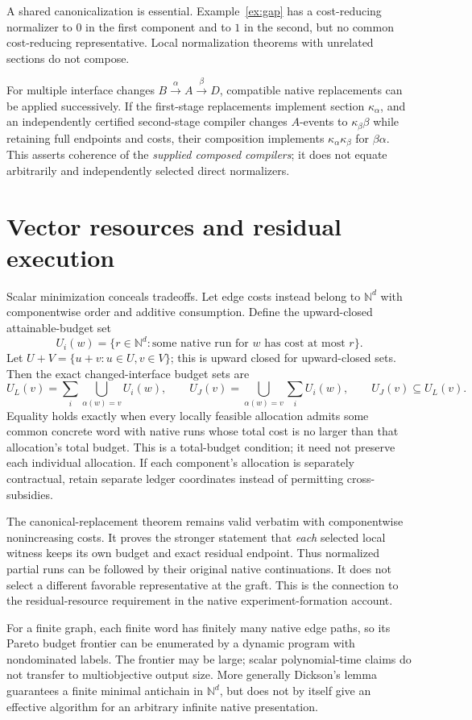 \documentclass[11pt]{article}
\newcommand{\NN}{\mathbb N}
\begin{document}
A shared canonicalization is essential. Example~\ref{ex:gap} has a cost-reducing normalizer to $0$ in the first component and to $1$ in the second, but no common cost-reducing representative. Local normalization theorems with unrelated sections do not compose.

For multiple interface changes $B\xrightarrow{\alpha}A\xrightarrow{\beta}D$, compatible native replacements can be applied successively. If the first-stage replacements implement section $\kappa_\alpha$, and an independently certified second-stage compiler changes $A$-events to $\kappa_\beta\beta$ while retaining full endpoints and costs, their composition implements $\kappa_\alpha\kappa_\beta$ for $\beta\alpha$. This asserts coherence of the \emph{supplied composed compilers}; it does not equate arbitrarily and independently selected direct normalizers.

\section{Vector resources and residual execution}
Scalar minimization conceals tradeoffs. Let edge costs instead belong to $\NN^d$ with componentwise order and additive consumption. Define the upward-closed attainable-budget set
\[
 U_i(w)=\{r\in\NN^d:\text{some native run for }w\text{ has cost at most }r\}.
\]
Let $U+V=\{u+v:u\in U,v\in V\}$; this is upward closed for upward-closed sets. Then the exact changed-interface budget sets are
\[
 U_L(v)=\sum_i\bigcup_{\alpha(w)=v}U_i(w),\qquad
 U_J(v)=\bigcup_{\alpha(w)=v}\sum_i U_i(w),
 \qquad U_J(v)\subseteq U_L(v).
\]
Equality holds exactly when every locally feasible allocation admits some common concrete word with native runs whose total cost is no larger than that allocation's total budget. This is a total-budget condition; it need not preserve each individual allocation. If each component's allocation is separately contractual, retain separate ledger coordinates instead of permitting cross-subsidies.

The canonical-replacement theorem remains valid verbatim with componentwise nonincreasing costs. It proves the stronger statement that \emph{each} selected local witness keeps its own budget and exact residual endpoint. Thus normalized partial runs can be followed by their original native continuations. It does not select a different favorable representative at the graft. This is the connection to the residual-resource requirement in the native experiment-formation account.

For a finite graph, each finite word has finitely many native edge paths, so its Pareto budget frontier can be enumerated by a dynamic program with nondominated labels. The frontier may be large; scalar polynomial-time claims do not transfer to multiobjective output size. More generally Dickson's lemma guarantees a finite minimal antichain in $\NN^d$, but does not by itself give an effective algorithm for an arbitrary infinite native presentation.
\end{document}
